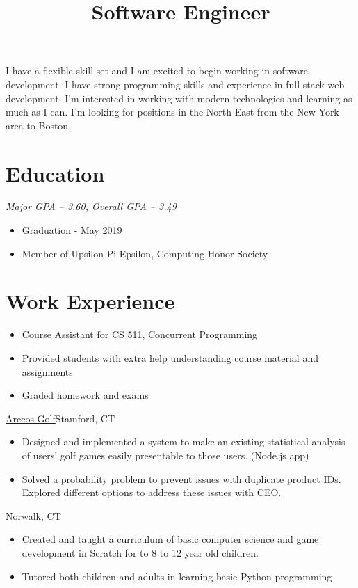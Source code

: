 \documentclass[11pt,letterpaper,roman]{moderncv}
\title{Software Engineer}
\begin{document}
\makecvtitle
\vspace*{-7mm}


{
    I have a flexible skill set and I am excited to begin working in software development.
    I have strong programming skills and experience in full stack web development. 
    I'm interested in working with modern technologies and learning as much as I can. 
    I'm looking for positions in the North East from the New York area to Boston.
}

\section{Education}
{
    \textit{Major GPA -- 3.60, Overall GPA -- 3.49}
    \begin{itemize}
        \item Graduation - May 2019
        \item Member of Upsilon Pi Epsilon, Computing Honor Society
    \end{itemize}
}

\section{Work Experience}
{
    \begin{itemize}
        \item Course Assistant for CS 511, Concurrent Programming
        \item Provided students with extra help understanding course material and assignments
        \item Graded homework and exams
    \end{itemize}
}
{\href{http://www.arccosgolf.com/}{Arccos Golf}}{Stamford, CT}{}
{
    \begin{itemize}
        \item Designed and implemented a system to make an existing statistical analysis of users'
              golf games easily presentable to those users. (Node.js app)
        \item Solved a probability problem to prevent issues with duplicate product IDs.
              Explored different options to address these issues with CEO.
    \end{itemize}
}
{Norwalk, CT}{}
{
    \begin{itemize}
        \item Created and taught a curriculum of basic computer science and game development in
              Scratch for to 8 to 12 year old children.
        \item Tutored both children and adults in learning basic Python programming
    \end{itemize}
}
\end{document}
